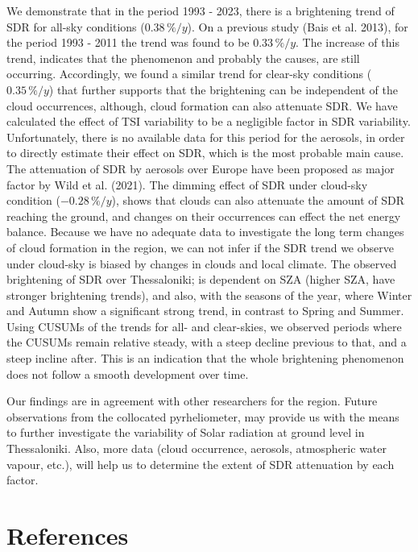 \documentclass[
  preprint, 3p, authoryear]{article}
\begin{document}
We demonstrate that in the period
1993 - 2023, there is a brightening trend of SDR for all-sky conditions (\(0.38\,\%/y\)).
On a previous study (Bais et al. 2013), for the period 1993 - 2011 the trend was found to be \(0.33\,\%/y\).
The increase of this trend, indicates that the phenomenon and probably the causes, are still occurring.
Accordingly, we found a similar trend for clear-sky conditions (\(0.35\,\%/y\)) that further supports that the brightening can be independent of the cloud occurrences, although, cloud formation can also attenuate SDR.
We have calculated the effect of TSI variability to be a negligible factor in SDR variability.
Unfortunately, there is no available data for this period for the aerosols, in order to directly estimate their effect on SDR, which is the most probable main cause.
The attenuation of SDR by aerosols over Europe have been proposed as major factor by Wild et al. (2021).
The dimming effect of SDR under cloud-sky condition (\(-0.28\,\%/y\)), shows that clouds can also attenuate the amount of SDR reaching the ground, and changes on their occurrences can effect the net energy balance.
Because we have no adequate data to investigate the long term changes of cloud formation in the region, we can not infer if the SDR trend we observe under cloud-sky is biased by changes in clouds and local climate.
The observed brightening of SDR over Thessaloniki; is dependent on SZA (higher SZA, have stronger brightening trends), and also, with the seasons of the year, where Winter and Autumn show a significant strong trend, in contrast to Spring and Summer.
Using CUSUMs of the trends for all- and clear-skies, we observed periods where the CUSUMs remain relative steady,
with a steep decline previous to that, and a steep incline after. This is an indication that the whole brightening phenomenon does not follow a smooth development over time.

Our findings are in agreement with other researchers for the region.
Future observations from the collocated pyrheliometer, may provide us with the means to further investigate the variability of Solar radiation at ground level in Thessaloniki.
Also, more data (cloud occurrence, aerosols, atmospheric water vapour, etc.), will help us to determine the extent of SDR attenuation by each factor.

\hypertarget{references}{%
\section*{References}\label{references}}
\end{document}
